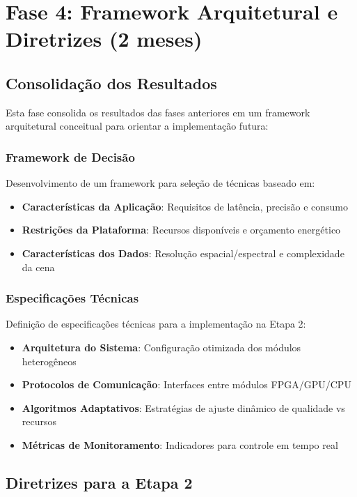 \section{Fase 4: Framework Arquitetural e Diretrizes (2 meses)}

\subsection{Consolidação dos Resultados}

Esta fase consolida os resultados das fases anteriores em um framework arquitetural conceitual para orientar a implementação futura:

\subsubsection{Framework de Decisão}

Desenvolvimento de um framework para seleção de técnicas baseado em:
\begin{itemize}
\item \textbf{Características da Aplicação}: Requisitos de latência, precisão e consumo
\item \textbf{Restrições da Plataforma}: Recursos disponíveis e orçamento energético
\item \textbf{Características dos Dados}: Resolução espacial/espectral e complexidade da cena
\end{itemize}

\subsubsection{Especificações Técnicas}

Definição de especificações técnicas para a implementação na Etapa 2:
\begin{itemize}
\item \textbf{Arquitetura do Sistema}: Configuração otimizada dos módulos heterogêneos
\item \textbf{Protocolos de Comunicação}: Interfaces entre módulos FPGA/GPU/CPU
\item \textbf{Algoritmos Adaptativos}: Estratégias de ajuste dinâmico de qualidade vs recursos
\item \textbf{Métricas de Monitoramento}: Indicadores para controle em tempo real
\end{itemize}

\subsection{Diretrizes para a Etapa 2}

